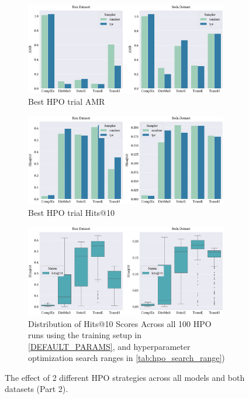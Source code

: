 \begin{figure}[!ht]
    \centering
    \begin{subfigure}[b]{\textwidth}
        \centering
        \includegraphics[width=0.97\textwidth]{figures/hpo_best_trial_AMR.eps}
        \caption{Best \ac{HPO} trial \ac{AMR}}
        \label{subfig:hpo_best_trial_AMR}
    \end{subfigure}
    
    \begin{subfigure}[b]{\textwidth}
        \centering
        \includegraphics[width=0.97\textwidth]{figures/hpo_best_trial_hits@10.eps}
        \caption{Best \ac{HPO} trial Hits@10}
        \label{subfig:hpo_best_trial_hits@10}
    \end{subfigure}
    
    \begin{subfigure}[b]{\textwidth}
        \centering
        \includegraphics[width=0.97\textwidth]{figures/hpo_summary_overall_hits@10.eps}
        \caption{Distribution of Hits@10 Scores Across all 100 HPO runs using the training setup in \autoref{DEFAULT_PARAMS}, and hyperparameter optimization search ranges in \autoref{tab:hpo_search_range})}
        \label{subfig:hpo_summary}
    \end{subfigure}
    
    \caption{The effect of 2 different \ac{HPO} strategies across all models and both datasets (Part 2).}
    \label{fig:effect_of_2_different_HPO_strategies_part2}
\end{figure}

